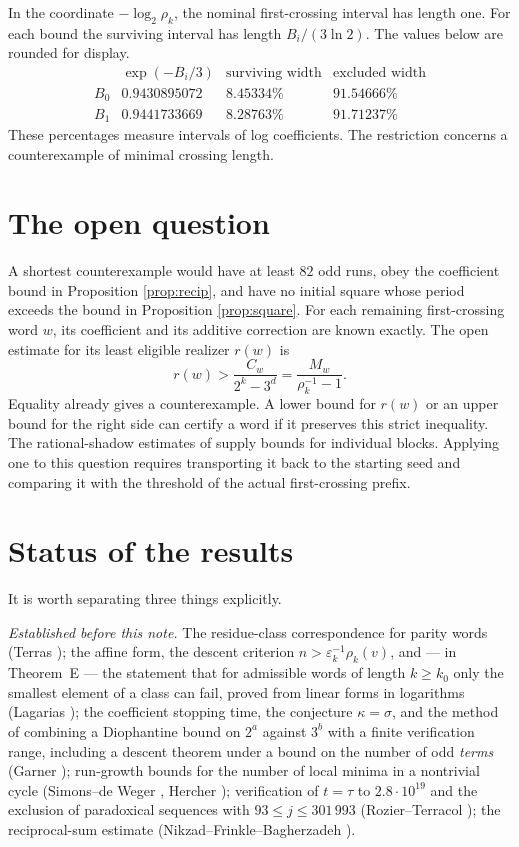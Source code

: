 \documentclass[11pt,a4paper]{article}
\theoremstyle{plain}\newtheorem{theorem}{Theorem}\newtheorem{proposition}[theorem]{Proposition}
\theoremstyle{definition}\newtheorem{example}[theorem]{Example}
\theoremstyle{remark}\newtheorem{remark}[theorem]{Remark}
\begin{document}
In the coordinate $-\log_2\rho_k$, the nominal first-crossing interval has length
one. For each bound the surviving interval has length $B_i/(3\ln2)$. The values
below are rounded for display.
\[
\begin{array}{c|c|c|c}
 &\exp(-B_i/3)&\text{surviving width}&\text{excluded width}\\\hline
 B_0&0.9430895072&8.45334\%&91.54666\%\\
 B_1&0.9441733669&8.28763\%&91.71237\%
\end{array}
\]
These percentages measure intervals of log coefficients. The restriction concerns a
counterexample of minimal crossing length.

\section{The open question}\label{sec:open}
A shortest counterexample would have at least $82$ odd runs, obey the coefficient bound in
Proposition \ref{prop:recip}, and have no initial square whose period exceeds the bound in
Proposition \ref{prop:square}. For each remaining first-crossing word $w$, its coefficient
and its additive correction are known exactly. The open estimate for its least eligible
realizer $r(w)$ is
\[
             r(w)>\frac{C_w}{2^k-3^d}=\frac{M_w}{\rho_k^{-1}-1}.
\]
Equality already gives a counterexample. A lower bound for $r(w)$ or an upper bound
for the right side can certify a word if it preserves this strict inequality.
The rational-shadow estimates of \cite{dj-shadow2026} supply bounds for individual blocks.
Applying one to this question requires transporting it back to the starting seed and comparing
it with the threshold of the actual first-crossing prefix.

\newpage
\section*{Status of the results}
It is worth separating three things explicitly.

\emph{Established before this note.} The residue-class correspondence for parity words
(Terras \cite{terras1976}); the affine form, the descent criterion
$n>\varepsilon_k^{-1}\rho_k(v)$, and --- in Theorem~E --- the statement that for admissible
words of length $k\ge k_0$ only the smallest element of a class can fail, proved from linear
forms in logarithms (Lagarias \cite[\S2.2--\S2.3, Thm.~E]{lagarias1985}); the coefficient stopping time, the conjecture
$\kappa=\sigma$, and the method of combining a Diophantine bound on $2^a$ against $3^b$ with a
finite verification range, including a descent theorem under a bound on the number of odd
\emph{terms} (Garner \cite{garner1981}); run-growth bounds for the number of local minima in a
nontrivial cycle (Simons--de Weger \cite{simonsdeweger2005}, Hercher \cite{hercher2023});
verification of $t=\tau$ to $2.8\cdot10^{19}$ and the exclusion of paradoxical sequences with
$93\le j\le301\,993$ (Rozier--Terracol \cite{rozier2026}); the reciprocal-sum estimate
(Nikzad--Frinkle--Bagherzadeh \cite{nfb2026}).
\end{document}

